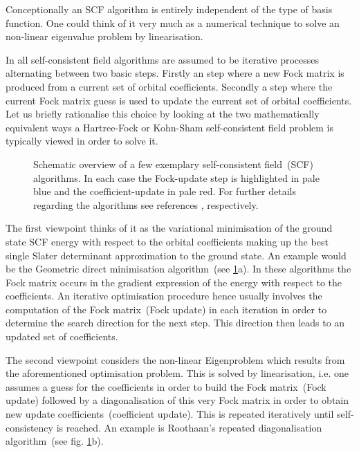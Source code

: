 %
%
Conceptionally an SCF algorithm is entirely independent of the type of basis function.
One could think of it very much as a numerical technique to solve
an non-linear eigenvalue problem by linearisation.
%
%


In \gscf all self-consistent field algorithms are assumed to be
iterative processes alternating between two basic steps.
Firstly an  step where a new Fock matrix is produced from a current set of
orbital coefficients.
Secondly a  step where the current Fock matrix guess
is used to update the current set of orbital coefficients.
Let us briefly rationalise this choice by 
looking at the two mathematically equivalent
ways a
Hartree-Fock or Kohn-Sham self-consistent field problem is typically
viewed in order to solve it.

\begin{figure}
	\centering
	\caption{Schematic overview of a few exemplary
		self-consistent field~(SCF) algorithms.
		In each case the Fock-update step is highlighted in pale blue
		and the coefficient-update in pale red.
		For further details regarding the algorithms see references
		\cite{Voorhis2002,Roothaan1951,Cances2000a}, respectively.
	}
	\label{fig:SCFs}
\end{figure}

The first viewpoint thinks of it as the variational minimisation
of the ground
state SCF energy with respect to the orbital coefficients making up
the best single Slater determinant approximation to the ground state.
An example would be the Geometric direct minimisation algorithm~(see \fig \ref{fig:SCFs}a).
In these algorithms the Fock matrix occurs in the gradient expression
of the energy with respect to the coefficients.
An iterative optimisation procedure hence
usually involves the computation of the Fock matrix~(Fock update)
in each iteration in order to determine the search direction
for the next step.
This direction then leads to an updated set of coefficients.

The second viewpoint considers the non-linear Eigenproblem
which results from the aforementioned optimisation problem.
This is solved by linearisation,
i.e. one assumes a guess for the coefficients
in order to build the Fock matrix~(Fock update)
followed by a diagonalisation of this very Fock matrix
in order to obtain new update coefficients~(coefficient update).
This is repeated iteratively until self-consistency is reached.
An example is Roothaan's repeated diagonalisation algorithm~(see fig. \ref{fig:SCFs}b).

